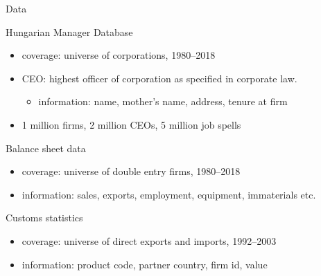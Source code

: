\documentclass[
  ignorenonframetext,
  aspectratio=43,
]{beamer}
\providecommand{\tightlist}{%
  \setlength{\itemsep}{0pt}\setlength{\parskip}{0pt}}
\begin{document}
\begin{frame}{Data}
\begin{block}{Hungarian Manager Database}
\protect\hypertarget{hungarian-manager-database}{}
\begin{itemize}
\tightlist
\item
  coverage: universe of corporations, 1980--2018
\item
  CEO: highest officer of corporation as specified in corporate law.

  \begin{itemize}
  \tightlist
  \item
    information: name, mother's name, address, tenure at firm
  \end{itemize}
\item
  1 million firms, 2 million CEOs, 5 million job spells
\end{itemize}
\end{block}

\begin{block}{Balance sheet data}
\protect\hypertarget{balance-sheet-data}{}
\begin{itemize}
\tightlist
\item
  coverage: universe of double entry firms, 1980--2018
\item
  information: sales, exports, employment, equipment, immaterials etc.
\end{itemize}
\end{block}

\begin{block}{Customs statistics}
\protect\hypertarget{customs-statistics}{}
\begin{itemize}
\tightlist
\item
  coverage: universe of direct exports and imports, 1992--2003
\item
  information: product code, partner country, firm id, value
\end{itemize}
\end{block}
\end{frame}
\end{document}
